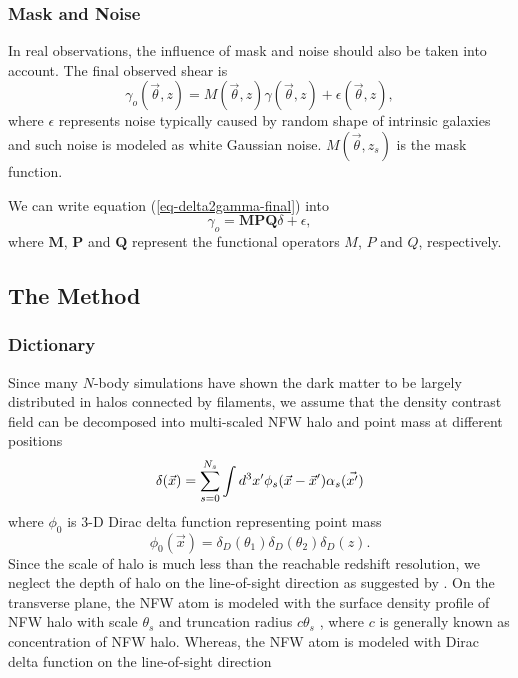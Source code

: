 \documentclass[twocolumn]{aastex62}
\begin{document}
\subsubsection{Mask and Noise}
In real observations, the influence of mask and noise should also be taken into account. The final observed shear is
\begin{equation}\label{eq-delta2gamma-final}
\gamma_o(\vec{\theta},z)=M(\vec{\theta},z) \gamma(\vec{\theta},z) + \epsilon(\vec{\theta},z),
\end{equation}
where $\epsilon$ represents noise typically caused by random shape of intrinsic galaxies and such noise is modeled as white Gaussian noise. $M(\vec{\theta},z_s)$ is the mask function.

We can write equation (\ref{eq-delta2gamma-final}) into
\begin{equation}\label{eq-delta2gamma-operator-final}
\gamma_o =\mathbf{M}  \mathbf{P} \mathbf{Q} \delta + \epsilon,
\end{equation}
where $\mathbf{M}$,  $\mathbf{P}$ and $\mathbf{Q}$ represent the functional operators $M$, $P$ and $Q$, respectively.

\subsection{The Method}
\label{sec:kappaMap}

\subsubsection{Dictionary}
Since many $N$-body simulations have shown the dark matter to be largely distributed in halos connected by filaments,
we assume that the density contrast field can be decomposed into multi-scaled NFW halo \citep{halo-NFW1997ApJ} and point mass at different positions
\begin{equation}
\delta(\vec{x}) = \sum_{s=0}^{N_s} \int d^3 x' \phi_s(\vec{x}-\vec{x}') \alpha_s(\vec{x'})\\
\end{equation}
where $\phi_0$ is $3$-D Dirac delta function representing point mass
\begin{equation}
\phi_0(\vec{x})= \delta_D(\theta_1) \delta_D(\theta_2) \delta_D(z).
\end{equation}
Since the scale of halo is much less than the reachable redshift resolution, we neglect the depth of halo on the line-of-sight direction as suggested by \citep{massMap-Glimpse3D2014}.
On the transverse plane, the NFW atom is modeled with the surface density profile of NFW halo with scale $\theta_s$ and truncation radius $c \theta_s$ \citep{haloModel-TJ2003-3pt}, where $c$ is generally known as concentration of NFW halo.  Whereas, the NFW atom is modeled with Dirac delta function on the line-of-sight direction
\end{document}
